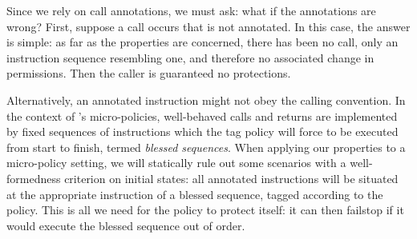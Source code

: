 \documentclass[acmsmall,review,anonymous]{acmart}\settopmatter{printfolios=true,printccs=false,printacmref=false}
\begin{document}

Since we rely on call annotations, we must ask: what if the annotations
are wrong? First, suppose a call occurs that is not annotated.
In this case, the answer is simple: as far as the properties are concerned, there has
been no call, only an instruction sequence resembling one, and
therefore no associated change in permissions. Then the caller is guaranteed no
protections.

Alternatively, an annotated instruction might not obey the calling convention.
In the context of \citeauthor{DBLP:conf/sp/RoesslerD18}'s micro-policies, well-behaved calls
and returns are implemented by fixed sequences of instructions which the tag policy
will force to be executed from start to finish, termed {\em blessed sequences}.
When applying our properties to a micro-policy setting, we will statically rule out some
scenarios with a well-formedness criterion on initial states: all annotated instructions will
be situated at the appropriate instruction of a blessed sequence, tagged according to the policy.
This is all we need for the policy to protect itself: it can then failstop if it would
execute the blessed sequence out of order.


\end{document}
